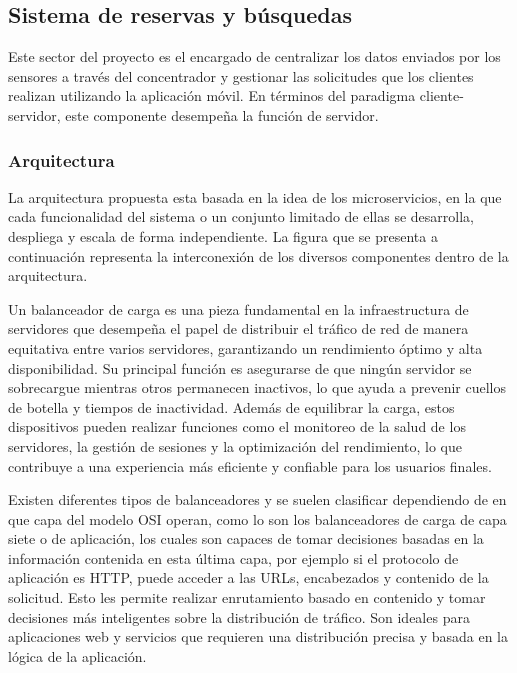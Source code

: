 \clearpage

\subsection{Sistema de reservas y búsquedas}
Este sector del proyecto es el encargado de centralizar los datos enviados por los sensores a través del concentrador y gestionar las solicitudes que los clientes realizan utilizando la aplicación móvil. En términos del paradigma cliente-servidor, este componente desempeña la función de servidor.



\subsubsection{Arquitectura}
La arquitectura propuesta esta basada en la idea de los microservicios, en la que cada funcionalidad del sistema o un conjunto limitado de ellas se desarrolla, despliega y escala de forma independiente. La figura que se presenta a continuación representa la interconexión de los diversos componentes dentro de la arquitectura.



Un balanceador de carga es una pieza fundamental en la infraestructura de servidores que desempeña el papel de distribuir el tráfico de red de manera equitativa entre varios servidores, garantizando un rendimiento óptimo y alta disponibilidad. Su principal función es asegurarse de que ningún servidor se sobrecargue mientras otros permanecen inactivos, lo que ayuda a prevenir cuellos de botella y tiempos de inactividad. Además de equilibrar la carga, estos dispositivos pueden realizar funciones como el monitoreo de la salud de los servidores, la gestión de sesiones y la optimización del rendimiento, lo que contribuye a una experiencia más eficiente y confiable para los usuarios finales.

Existen diferentes tipos de balanceadores y se suelen clasificar dependiendo de en que capa del modelo OSI operan, como lo son los balanceadores de carga de capa siete o de aplicación, los cuales son capaces de tomar decisiones basadas en la información contenida en esta última capa, por ejemplo si el protocolo de aplicación es HTTP, puede acceder a las URLs, encabezados y contenido de la solicitud. Esto les permite realizar enrutamiento basado en contenido y tomar decisiones más inteligentes sobre la distribución de tráfico. Son ideales para aplicaciones web y servicios que requieren una distribución precisa y basada en la lógica de la aplicación.



